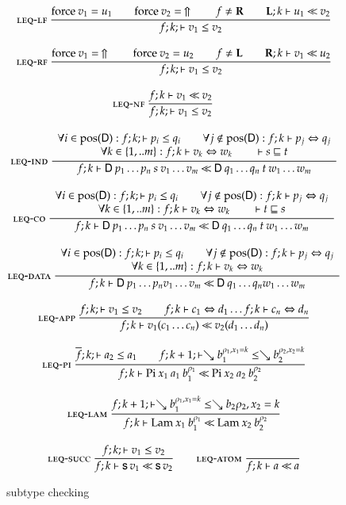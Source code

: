 \begin{figure}[p]
\begin{gather*}
\mbox{\sc leq-lf}\ \dfrac{\mathrm{force} \: v_1 = u_1 \qquad \mathrm{force} \: v_2 = \:\Uparrow 
\qquad
f \neq \mathbf{R} \qquad \mathbf{L};k\vdash u_1{\:\ll\:}v_2}{ f;k;\vdash v_1\leq v_2}
\\[2ex]
\mbox{\sc leq-rf}\ \dfrac{\mathrm{force} \: v_1 = \:\Uparrow \qquad \mathrm{force} \: v_2 = u_2 
\qquad
f \neq \mathbf{L} \qquad \mathbf{R};k\vdash v_1{\:\ll\:}u_2}{ f;k;\vdash v_1\leq v_2}
\\[2ex]
\mbox{\sc leq-nf}\ \dfrac{f;k\vdash v_1{\:\ll\:}v_2}{ f;k;\vdash v_1\leq v_2}
\qquad
\\[2ex]
\mbox{\sc leq-ind}\ \dfrac{\begin{array}[b]{c}\forall i \in \mbox{pos}(\mathsf{D}): f;k;\vdash p_i\leq q_i 
\qquad
\forall j \notin \mbox{pos}(\mathsf{D}): f;k\vdash p_j\Leftrightarrow q_j 
\\\forall k \in \{1,..m\}: f;k\vdash v_k\Leftrightarrow w_k
\qquad
\vdash s\sqsubseteq t \end{array}}{f;k\vdash\mathsf{D} \: p_1 \ldots p_n \: s \: v_1 \ldots v_m{\:\ll\:}\mathsf{D} \: q_1 \ldots q_n \: t \: w_1 \ldots w_m}
\\[2ex]
\mbox{\sc leq-co}\ \dfrac{\begin{array}[b]{c}\forall i \in \mbox{pos}(\mathsf{D}): f;k;\vdash p_i\leq q_i 
\qquad
\forall j \notin \mbox{pos}(\mathsf{D}): f;k\vdash p_j\Leftrightarrow q_j\\\forall k \in \{1,..m\}:f;k\vdash v_k\Leftrightarrow w_k
\qquad
\vdash t\sqsubseteq s \end{array}}{f;k\vdash\mathsf{D} \: p_1 \ldots p_n \: s \: v_1 \ldots v_m{\:\ll\:}\mathsf{D} \: q_1 \ldots q_n \: t \: w_1 \ldots w_m}
\\[2ex]
\mbox{\sc leq-data}\ \dfrac{\begin{array}[b]{c}\forall i \in \mbox{pos}(\mathsf{D}): f;k;\vdash p_i\leq q_i 
\qquad
\forall j \notin \mbox{pos}(\mathsf{D}): f;k\vdash p_j\Leftrightarrow q_j\\\forall k \in \{1,..m\}:f;k\vdash v_k\Leftrightarrow w_k\end{array}}{f;k\vdash\mathsf{D} \: p_1 \ldots p_n v_1 \ldots v_m{\:\ll\:}\mathsf{D} \: q_1 \ldots q_n w_1 \ldots w_m}
\\[2ex]
\mbox{\sc leq-app}\ \dfrac{f;k;\vdash v_1\leq v_2 \qquad
f;k\vdash c_1\Leftrightarrow d_1 \ldots f;k\vdash c_n\Leftrightarrow d_n}{f;k\vdash v_1 (c_1 \ldots c_n){\:\ll\:}v_2 (d_1 \ldots d_n)}
\\[2ex]
\mbox{\sc leq-pi}\ \dfrac{\overline{f};k;\vdash a_2\leq a_1
\qquad
f;k+1;\vdash\searrow b_1^{\rho_1,x_1=k}\leq\searrow b_2^{\rho_2,x_2=k}}{f;k\vdash\mathrm{Pi} \: x_1 \: a_1 \: b_1^{\rho_1}{\:\ll\:}\mathrm{Pi} \: x_2 \: a_2 \: b_2^{\rho_2}}
\\[2ex]
\mbox{\sc leq-lam}\ \dfrac{f;k+1;\vdash\searrow b_1^{\rho_1,x_1=k}\leq\searrow{b_2}{\rho_2,x_2=k}}{f;k\vdash\mathrm{Lam} \: x_1 \: b_1^{\rho_1}{\:\ll\:}\mathrm{Lam} \: x_2 \: b_2^{\rho_2}}
\\[2ex]
\mbox{\sc leq-succ}\ \dfrac{f;k;\vdash v_1\leq v_2}{f;k\vdash\mathsf{s}\, v_1{\:\ll\:}\mathsf{s}\, v_2}
\qquad
\mbox{\sc leq-atom}\ \dfrac{}{f;k\vdash a{\:\ll\:}a}
\end{gather*}
\caption{subtype checking}
\end{figure}

